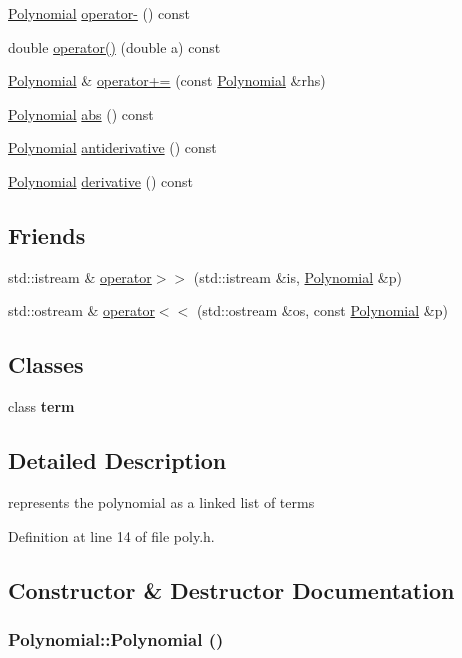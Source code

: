 \begin{CompactItemize}
\hyperlink{classPolynomial}{Polynomial} \hyperlink{classPolynomial_d052b311f23798bf5136bd7444fd91d2}{operator-} () const 
\item 
double \hyperlink{classPolynomial_c6eae37f11f87b541fa430de3643a31a}{operator()} (double a) const 
\item 
\hyperlink{classPolynomial}{Polynomial} \& \hyperlink{classPolynomial_2ceb25a673d4c03b346595639ade0981}{operator+=} (const \hyperlink{classPolynomial}{Polynomial} \&rhs)
\item 
\hyperlink{classPolynomial}{Polynomial} \hyperlink{classPolynomial_1e8588431fc5799e62bba71368a7234d}{abs} () const 
\item 
\hyperlink{classPolynomial}{Polynomial} \hyperlink{classPolynomial_4db9e4f680c52fb8af45f3ae985a4055}{antiderivative} () const 
\item 
\hyperlink{classPolynomial}{Polynomial} \hyperlink{classPolynomial_aef1ed2dbc29d419c58c6d61b35853c3}{derivative} () const 
\end{CompactItemize}
\subsection*{Friends}
\begin{CompactItemize}
\item 
std::istream \& \hyperlink{classPolynomial_1446b464245742ccedeacb27fd794bab}{operator$>$$>$} (std::istream \&is, \hyperlink{classPolynomial}{Polynomial} \&p)
\item 
std::ostream \& \hyperlink{classPolynomial_f1fdf53b29100b084772816cb9ecc8ac}{operator$<$$<$} (std::ostream \&os, const \hyperlink{classPolynomial}{Polynomial} \&p)
\end{CompactItemize}
\subsection*{Classes}
\begin{CompactItemize}
\item 
class \textbf{term}
\end{CompactItemize}


\subsection{Detailed Description}
represents the polynomial as a linked list of terms 

Definition at line 14 of file poly.h.

\subsection{Constructor \& Destructor Documentation}
\hypertarget{classPolynomial_961dec5c0727f03e5273f74a345dfbb6}{
\subsubsection[Polynomial]{\setlength{\rightskip}{0pt plus 5cm}Polynomial::Polynomial ()}}
\label{classPolynomial_961dec5c0727f03e5273f74a345dfbb6}


